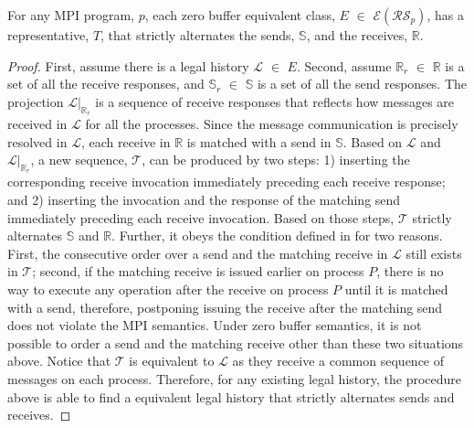 
\begin{theorem}
For any MPI program, $\mathit{p}$, each zero buffer equivalent class, $\mathit{E}$ $\in$ $\mathcal{E}(\mathcal{RS}_\mathit{p})$, has a representative, $T$, that strictly alternates the sends, $\mathbb{S}$, and the receives, $\mathbb{R}$.
\end{theorem}

\begin{proof}
First, assume there is a legal history $\mathcal{L}$ $\in$ $\mathit{E}$. Second, assume $\mathbb{R}_r$ $\in$ $\mathbb{R}$ is a set of all the receive responses, and $\mathbb{S}_r$ $\in$ $\mathbb{S}$ is a set of all the send responses. The projection $\mathcal{L} | _{\mathbb{R}_r}$ is a sequence of receive responses that reflects how messages are received in $\mathcal{L}$ for all the processes. Since the message communication is precisely resolved in $\mathcal{L}$, each receive in $\mathbb{R}$ is matched with a send in $\mathbb{S}$. Based on $\mathcal{L}$ and $\mathcal{L} | _{\mathbb{R}_r}$, a new sequence, $\mathcal{T}$, can be produced by two steps: 1) inserting the corresponding receive invocation immediately preceding each receive response; and 2) inserting the invocation and the response of the matching send immediately preceding each receive invocation. Based on those steps, $\mathcal{T}$ strictly alternates $\mathbb{S}$ and $\mathbb{R}$. Further, it obeys the condition defined in  for two reasons. First, the consecutive order over a send and the matching receive in $\mathcal{L}$ still exists in $\mathcal{T}$; second, if the matching receive is issued earlier on process $P$, there is no way to execute any operation after the receive on process $P$ until it is matched with a send, therefore, postponing issuing the receive after the matching send does not violate the MPI semantics. Under zero buffer semantics, it is not possible to order a send and the matching receive other than these two situations above. Notice that $\mathcal{T}$ is equivalent to $\mathcal{L}$ as they receive a common sequence of messages on each process. Therefore, for any existing legal history, the procedure above is able to find a equivalent legal history that strictly alternates sends and receives. 
\end{proof}
